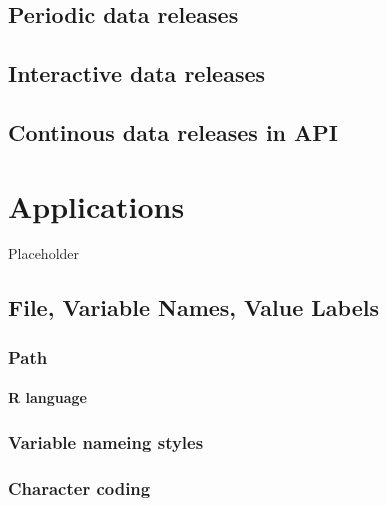 \documentclass[
  fontsize=13pt,
  english,
  a4paper,
  openany, a4paper, oneside]{book}
\begin{document}
\hypertarget{periodic-data-releases}{%
\section{Periodic data releases}\label{periodic-data-releases}}

\hypertarget{interactive-data-releases}{%
\section{Interactive data releases}\label{interactive-data-releases}}

\hypertarget{continous-data-releases-in-api}{%
\section{Continous data releases in API}\label{continous-data-releases-in-api}}

\hypertarget{applications}{%
\chapter{Applications}\label{applications}}

Placeholder

\hypertarget{naming-conventions}{%
\section{File, Variable Names, Value Labels}\label{naming-conventions}}

\hypertarget{path}{%
\subsection{Path}\label{path}}

\hypertarget{R-guide}{%
\subsubsection{R language}\label{R-guide}}

\hypertarget{variable-nameing-styles}{%
\subsection{Variable nameing styles}\label{variable-nameing-styles}}

\hypertarget{character-coding}{%
\subsection{Character coding}\label{character-coding}}
\end{document}
